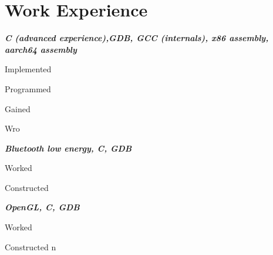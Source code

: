 \documentclass[letterpaper, 10pt]{deedy-resume} %
\begin{document}
\begin{minipage}[t]{0.65\textwidth} %

\section{Work Experience}

\textit{\bf{C (advanced experience),GDB, GCC (internals), x86 assembly, aarch64 assembly}}
\vspace{\topsep} %
\begin{tightitemize}
\item Implemented 
\item Programmed 
\item Gained 
\item Wro
\end{tightitemize}
\sectionspace 

\textit{\bf{Bluetooth low energy, C, GDB}}
\vspace{\topsep} %
\begin{tightitemize}
\item Worked 
\item Constructed 
\end{tightitemize}
\sectionspace

\textit{\bf{OpenGL, C, GDB}}
\vspace{\topsep} %
\begin{tightitemize}
\item Worked 
\item Constructed n
\end{tightitemize}
\sectionspace


\end{minipage}
\end{document}
